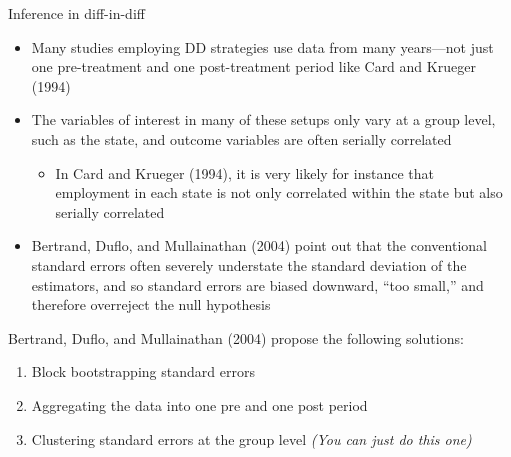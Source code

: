 \documentclass[compress, 8pt]{beamer}
\begin{document}
\begin{frame}{Inference in diff-in-diff}

\begin{itemize}
    \item Many studies employing DD strategies use data from many years—not just one pre-treatment and one post-treatment period like Card and Krueger (1994)

    \item The variables of interest in many of these setups only vary at a group level, such as the state, and outcome variables are often serially correlated

    \begin{itemize}
        \item In Card and Krueger (1994), it is very likely for instance that employment in each state is not only correlated within the state but also serially correlated
    \end{itemize}

    \item Bertrand, Duflo, and Mullainathan (2004) point out that the conventional standard errors often severely understate the standard deviation of the estimators, and so standard errors are biased downward, “too small,” and therefore overreject the null hypothesis
\end{itemize}

Bertrand, Duflo, and Mullainathan (2004) propose the following solutions:
\begin{enumerate}
    \item Block bootstrapping standard errors

    \item Aggregating the data into one pre and one post period

    \item \alert{Clustering standard errors at the group level} \emph{(You can just do this one)}

\end{enumerate}


\end{frame}
\end{document}
